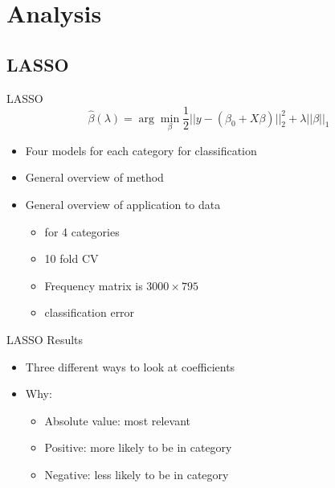 \documentclass[12pt, trans]{beamer}
\newcommand{\1}[1]{{\mathbf 1}\left\{#1\right\}}        %
\begin{document}
\clearpage 
\section{Analysis}


\subsection{LASSO}

\begin{frame}[fragile]{LASSO}
\[
\hat{\beta}(\lambda) = \arg \min_\beta \frac{1}{2}||y-(\beta_0+X\beta)||_2^2 + \lambda ||\beta||_1
\]
\begin{itemize}[<+->]
\item Four models for each category for classification
\item General overview of method
\item General overview of application to data
	\begin{itemize}
	\item for 4 categories
	\item 10 fold CV
	\item Frequency matrix is $3000 \times 795$
	\item classification error
	\end{itemize}
	
\end{itemize}

\end{frame}

\begin{frame}{LASSO Results} 

\begin{itemize}[<+->]
\item Three different ways to look at coefficients
\item Why:
	\begin{itemize}
	\item Absolute value: most relevant
	\item Positive: more likely to be in category
	\item Negative: less likely to be in category	
	\end{itemize}
	
\end{itemize}

\end{frame}
\end{document}
